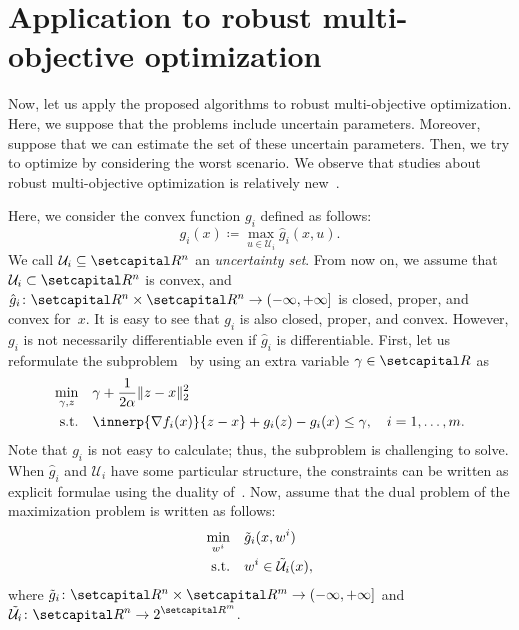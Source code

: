\documentclass[../../main]{subfiles}
\begin{document}
\section{Application to robust multi-objective optimization} 
Now, let us apply the proposed algorithms to robust multi-objective optimization.
Here, we suppose that the problems include uncertain parameters.
Moreover, suppose that we can estimate the set of these uncertain parameters.
Then, we try to optimize by considering the worst scenario.
We observe that studies about robust multi-objective optimization is relatively new~\cite{Ehrgott2014,Fliege2014,Morishita2016}.

Here, we consider the convex function $g_i$ defined as follows:
\begin{equation} \label{eq:g_i}
    g_i(x) \coloneqq \max_{u \in {\mathcal{U}}_i } \hat{g}_i (x,u).
\end{equation}
We call ${\mathcal{U}}_i \subseteq \setR^n$ an \emph{uncertainty set}.
From now on, we assume that~${\mathcal{U}}_i \subset \setR^n$ is convex, and~$\hat{g}_i \colon \setR^n \times \setR^n \to (-\infty, +\infty]$ is closed, proper, and convex for~$x$.
It is easy to see that $g_i$ is also closed, proper, and convex.
However, $g_i$ is not necessarily differentiable even if $\hat{g}_i$ is differentiable.
First, let us reformulate the subproblem~ by using an extra variable $\gamma \in \setR$ as
\begin{equation}
    \begin{aligned}
        \min_{\gamma, z} \quad   &\gamma + \frac{1}{2 \alpha}\norm{z - x}_2^2  \\ 
        \st    \quad   &\innerp{\nabla f_i(x)}{z - x} + g_i(z) - g_i(x) \leq \gamma, \quad i = 1,\ldots,m.
    \end{aligned}
\end{equation}
Note that $g_i$ is not easy to calculate; thus, the subproblem is challenging to solve.
When $\hat{g}_i$ and $\mathcal{U}_i$ have some particular structure, the constraints can be written as explicit formulae using the duality of~.
Now, assume that the dual problem of the maximization problem  is written as follows:
\begin{align}
\min_{w^i} \quad &\tilde{g}_i (x, w^i)  \\ 
\mathrm{s.t.}    \quad   &w^i \in \tilde{\mathcal{U}}_i (x),
\end{align}
where $\tilde{g}_i \colon \setR^n \times \setR^m \to (-\infty, +\infty]$ and $\displaystyle \tilde{\mathcal{U}}_i \colon \setR^n \to 2^{\setR^m}$.
\end{document}
